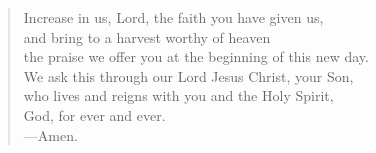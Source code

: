 \prayer

\setlength{\vleftmargin}{\prayerleftmargini}

\begin{verse}
Increase in us, Lord, the faith you have given us,\\
and bring to a harvest worthy of heaven\\
the praise we offer you at the beginning of this new day.\\
We ask this through our Lord Jesus Christ, your Son,\\
who lives and reigns with you and the Holy Spirit,\\
God, for ever and ever.\\
{\color{red}---\thinspace}Amen.
\end{verse}

\setlength{\vleftmargin}{\defleftmargini}